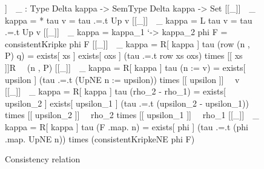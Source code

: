 \begin{figure}
\begin{agdaf}
[[_]]~~_ : Type Delta kappa -> SemType Delta kappa -> Set
[[_]]~~_ {kappa = *} tau  v = tau .=.t Up v
[[_]]~~_ {kappa = L} tau  v = tau .=.t Up v
[[_]]~~_ {kappa = kappa_1 `-> kappa_2} phi F = consistentKripke phi F
[[_]]~~_ {kappa = R[ kappa ]} tau (row (n , P) q) =
  exists[ xs ] exists[ oxs ]
  (tau .=.t row xs oxs) times [[ xs ]]R~~ (n , P)
[[_]]~~_ {kappa = R[ kappa ]} tau (n := v) = 
  exists[ upsilon ] (tau .=.t (UpNE n := upsilon)) times [[ upsilon ]]~~ v
[[_]]~~_ {kappa = R[ kappa ]} tau (rho_2 - rho_1) = 
  exists[ upsilon_2 ] exists[ upsilon_1 ] (tau .=.t (upsilon_2 - upsilon_1))
  times [[ upsilon_2 ]]~~ rho_2 times [[ upsilon_1 ]]~~ rho_1
[[_]]~~_ {kappa = R[ kappa ]} tau (F .map. n) = 
  exists[ phi ] (tau .=.t (phi .map. UpNE n)) times 
  (consistentKripkeNE phi F)
\end{agdaf}
\caption{Consistency relation}
\label{fig:consistency-relation}
\end{figure}
